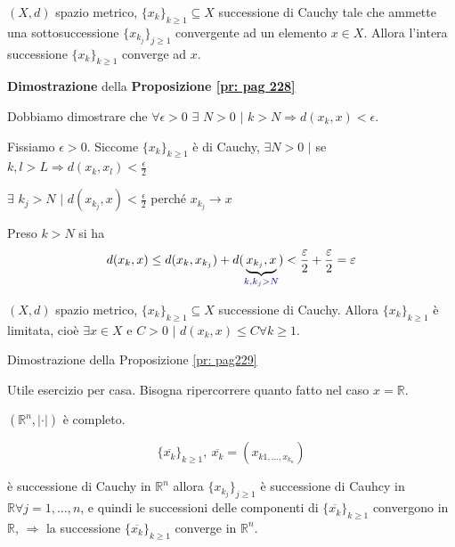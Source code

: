 \begin{proposition}
	\label{pr: pag 228}
	$(X,d)$ spazio metrico, $\{x_k\}_{k \geq 1} \subseteq X$ successione di Cauchy tale che ammette una sottosuccessione $\{x_{k_j}\}_{j\geq 1}$ convergente ad un elemento $x \in X$. Allora l'intera successione $\{x_k\}_{k\geq 1}$ converge ad $x$.
\end{proposition}


\begin{dembar}
	\textbf{Dimostrazione} della \textbf{Proposizione \ref{pr: pag 228}}
	
	Dobbiamo dimostrare che $\forall \epsilon >0 \,\,\exists \,\, N >0 \,\,\big|\,\, k > N \Rightarrow d(x_k,x)< \epsilon$. 
	
	Fissiamo $\epsilon >0$. Siccome $\{x_k\}_{k\geq 1}$ è di Cauchy, $\exists N >0 \,\, |$ se  $k,l >L \Rightarrow d(x_k,x_l)< \frac{\epsilon}{2}$
	
	$\exists \,\, k_j > N \,\,\big|\,\, d(x_{k_j},x)< \frac{\epsilon}{2}$ perché $x_{k_j} \rightarrow x$
	
	Preso $k > N$ si ha 
	$$d(x_k, x)\leq d(x_k,x_{k_j})+d(\underbrace{x_{k_j},x}_{\color{blue}{k, k_j > N}}) <\frac{\epsilon}{2}+\frac{\epsilon}{2}=\epsilon$$
\end{dembar}


\begin{proposition}
	\label{pr: pag229}
	$(X,d)$ spazio metrico, $\{x_k\}_{k \geq 1} \subseteq X$ successione di Cauchy. Allora $\{x_k\}_{k \geq 1}$ è limitata, cioè $\exists x \in X$ e $C >0 \,\, \big|\,\, d(x_k,x)\leq C \forall k \geq 1$.
\end{proposition}


\begin{dembar}
	Dimostrazione della Proposizione \ref{pr: pag229}
	
	Utile esercizio per casa. Bisogna ripercorrere quanto fatto nel caso $x = \mathbb{R}$.
\end{dembar}


\begin{exbar}
	$(\mathbb{R}^n,|\cdot|)$ è completo. 
	
	$$\{\overline{x_k}\}_{k\geq 1}, \ \overline{x_k} =(x_{k1, ..., x_{k_n}})$$
	
	è successione di Cauchy in $\mathbb{R}^n$ allora $\{x_{k_j}\}_{j \geq 1}$ è successione di Cauhcy in $\mathbb{R} \forall j = 1,...,n$, e quindi le successioni delle componenti di $\{\overline{x_k}\}_{k \geq 1}$ convergono in $\mathbb{R}$, $\Rightarrow$ la successione $\{\overline{x_k}\}_{k \geq 1}$ converge in $\mathbb{R}^n$.
\end{exbar}


